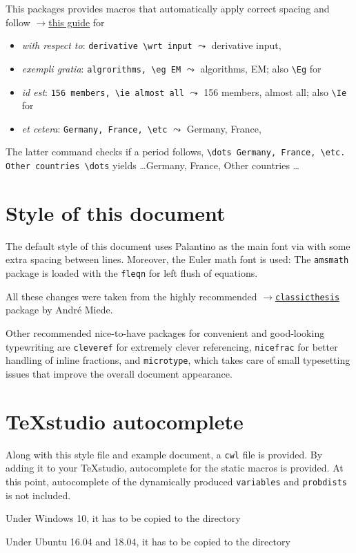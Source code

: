 \documentclass
[
]
{article}
\begin{document}
This packages provides macros that automatically apply correct spacing and follow \href{http://www.quickanddirtytips.com/education/grammar/ie-versus-eg?page=2}{$\rightarrow$this guide} for 
\begin{itemize}
	\item \emph{with respect to}: \texttt{derivative \textbackslash wrt input} $\leadsto$ derivative \wrt input,
	\item \emph{exempli gratia}: \texttt{algrorithms, \textbackslash eg EM} $\leadsto$ algorithms, \eg EM; also \texttt{\textbackslash Eg} for \Eg
	\item \emph{id est}: \texttt{156 members, \textbackslash ie almost all} $\leadsto$ 156 members, \ie almost all; also \texttt{\textbackslash Ie} for \Ie
	\item \emph{et cetera}: \texttt{Germany, France, \textbackslash etc} $\leadsto$ Germany, France, \etc
\end{itemize}
The latter command checks if a period follows, \ie \texttt{\textbackslash dots Germany, France, \textbackslash etc. Other countries \textbackslash dots} yields \dots Germany, France, \etc Other countries \dots

\section{Style of this document}
The default style of this document uses Palantino as the main font via 
with some extra spacing between lines. Moreover, the Euler math font is used:  The \texttt{amsmath} package is loaded with the \texttt{fleqn} for left flush of equations. 

All these changes were taken from the highly recommended \href{https://bitbucket.org/amiede/classicthesis/wiki/Home}{$\rightarrow$\texttt{classicthesis}} package by Andr\'e Miede.

Other recommended nice-to-have packages for convenient and good-looking typewriting are \texttt{cleveref} for extremely clever referencing, \texttt{nicefrac} for better handling of inline fractions, and \texttt{microtype}, which takes care of small typesetting issues that improve the overall document appearance.

\section{\TeX studio autocomplete}
Along with this style file and example document, a \texttt{cwl} file is provided. By adding it to your \TeX studio, autocomplete for the static macros is provided. At this point, autocomplete of the dynamically produced \texttt{variables} and \texttt{probdists} is not included.

Under Windows 10, it has to be copied to the directory  

Under Ubuntu 16.04 and 18.04, it has to be copied to the directory  

\printbibliography
\end{document}
